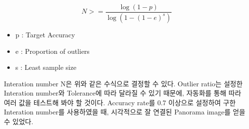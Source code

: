 \documentclass[]{report}
\begin{document}
\[ N >= \frac{\log{(1-p)}}{\log{(1 - (1 - e)^s )}} \]

\begin{itemize}
	\item p : Target Accuracy
	\item e : Proportion of outliers
	\item s : Least sample size
\end{itemize} 

Interation number N은 위와 같은 수식으로 결정할 수 있다. 
Outlier ratio는 설정한 Interation number와 Tolerance에 따라 달라질 수 있기 때문에, 
자동화를 통해 따라 여러 값을 테스트해 봐야 할 것이다. 
Accuracy rate를 0.7 이상으로 설정하여 구한 Interation number를 사용하였을 때, 시각적으로 잘 연결된 Panorama image를 얻을 수 있었다. \\
\end{document}
